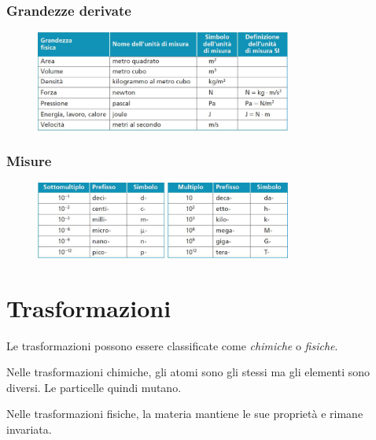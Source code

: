 \documentclass[a4paper]{article}
\begin{document}
\subsubsection{Grandezze derivate}

\begin{figure}[h]
    \centering
    \includegraphics[width=0.75\textwidth]{./grandezzederivate.png}
\end{figure}

\pagebreak

\subsubsection{Misure}

\begin{figure}[h]
    \centering
    \includegraphics[width=0.75\textwidth]{./misure.png}
\end{figure}

\pagebreak

\section{Trasformazioni}

Le trasformazioni possono essere classificate come \textit{chimiche} o \textit{fisiche}.


Nelle trasformazioni chimiche, gli atomi sono gli stessi ma gli elementi sono diversi.
Le particelle quindi mutano.


Nelle trasformazioni fisiche, la materia mantiene le sue proprietà e rimane invariata.
\end{document}
